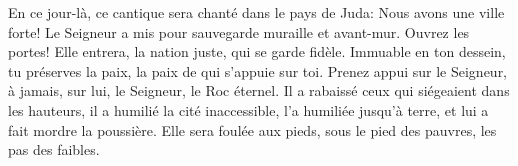 En ce jour-là, ce cantique sera chanté dans le pays de Juda:
	Nous avons une ville forte!
	Le Seigneur a mis pour sauvegarde muraille et avant-mur.
Ouvrez les portes!
	Elle entrera, la nation juste, qui se garde fidèle.
Immuable en ton dessein, tu préserves la paix,
	la paix de qui s’appuie sur toi.
Prenez appui sur le Seigneur,
	à jamais, sur lui, le Seigneur, le Roc éternel.
Il a rabaissé ceux qui siégeaient dans les hauteurs,
	il a humilié la cité inaccessible,
	l’a humiliée jusqu’à terre, et lui a fait mordre la poussière.
Elle sera foulée aux pieds,
	sous le pied des pauvres, les pas des faibles.

